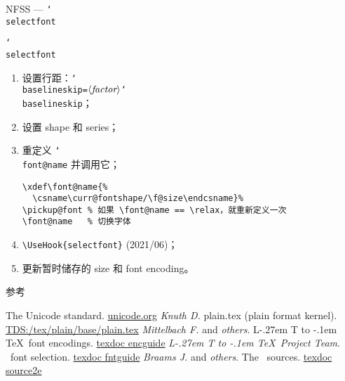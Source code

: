 \documentclass{beamer}
\makeatletter
\DeclareRobustCommand\LaTeX{L\kern-.27em%
  {\sbox\z@ T%
   \vbox to\ht\z@{\hbox{\check@mathfonts
                        \fontsize\sf@size\z@
                        \math@fontsfalse\selectfont
                        A}%
                  \vss}%
  }%
  \kern-.1em%
  \TeX}
\DeclareRobustCommand\cs[1]{\texttt{\char`\\#1}}
\DeclareRobustCommand\meta[1]{$\langle\hbox{\itshape#1}\rangle$}
\makeatother
\begin{document}
\begin{frame}[fragile]{NFSS --- \cs{selectfont}}
\begin{exampleblock}{\cs{selectfont}}
\begin{enumerate}
\item 设置行距：\cs{baselineskip}\;\texttt=\;\meta{factor}\cs{baselineskip}；
\item 设置 shape 和 series；
\item 重定义 \cs{font@name} 并调用它；
\begingroup
\color{gray}\scriptsize
\begin{verbatim}
\xdef\font@name{%
  \csname\curr@fontshape/\f@size\endcsname}%
\pickup@font % 如果 \font@name == \relax，就重新定义一次
\font@name   % 切换字体
\end{verbatim}
\endgroup
\item \verb|\UseHook{selectfont}| (2021/06)；
\item 更新暂时储存的 size 和 font encoding。
\end{enumerate}
\end{exampleblock}
\end{frame}

\begin{frame}{参考}
\begin{thebibliography}{9}
  The Unicode standard.\newblock
  \href{https://www.unicode.org/versions/latest/}
       {\ttfamily unicode.org}
  \textit{Knuth D.}\enskip
  plain.tex (plain format kernel).\newblock
  \href{http://mirrors.ctan.org/macros/plain/base/plain.tex}
       {\ttfamily TDS:/tex/plain/base/plain.tex}
  \textit{Mittelbach F.} and \textit{others}.\enskip
  \LaTeX\ font encodings.\newblock
  \href{http://mirrors.ctan.org/macros/latex/base/encguide.pdf}
       {\ttfamily texdoc encguide}
  \textit{\LaTeX\ Project Team}.\enskip
  \LaTeXe\ font selection.\newblock
  \href{http://mirrors.ctan.org/macros/latex/base/fntguide.pdf}
       {\ttfamily texdoc fntguide}
  \textit{Braams J.} and \textit{others}.\enskip
  The \LaTeXe\ sources.\newblock
  \href{http://mirrors.ctan.org/macros/latex/base/source2e.pdf}
       {\ttfamily texdoc source2e}
\end{thebibliography}
\end{frame}
\end{document}
